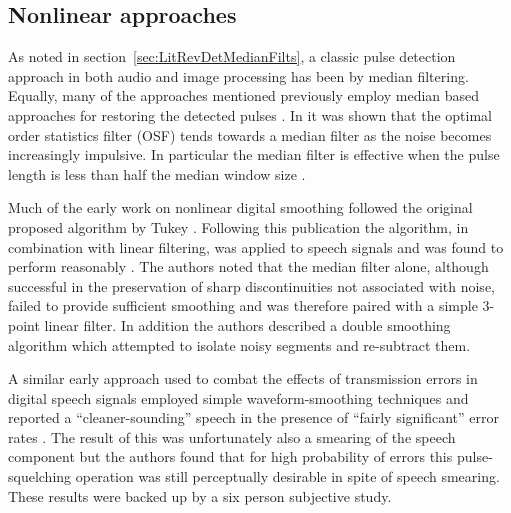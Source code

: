 \subsection{Nonlinear approaches}\label{sec:LitRev_RestorationNonLin}
As noted in section~\ref{sec:LitRevDetMedianFilts}, a classic pulse detection approach in both audio and image processing has been by median filtering. Equally, many of the approaches mentioned previously employ median based approaches for restoring the detected pulses \cite{Tukey1974}\cite{Lee1985}\cite{Heinonen1985}\cite{Heinonen1987}\cite{Maekivirta1991}\cite{Kasparis1993}\cite{Alajlan2004}. In \cite{Bovik1983} it was shown that the optimal order statistics filter (OSF) tends towards a median filter as the noise becomes increasingly impulsive. In particular the median filter is effective when the pulse length is less than half the median window size \cite{Alajlan2004}.

Much of the early work on nonlinear digital smoothing followed the original proposed algorithm by Tukey \cite{Tukey1974}. Following this publication the algorithm, in combination with linear filtering, was applied to speech signals and was found to perform reasonably \cite{Rabiner1975}. The authors noted that the median filter alone, although successful in the preservation of sharp discontinuities not associated with noise, failed to provide sufficient smoothing and was therefore paired with a simple 3-point linear filter. In addition the authors described a double smoothing algorithm which attempted to isolate noisy segments and re-subtract them.


%
%
A similar early approach used to combat the effects of transmission errors in digital speech signals employed simple waveform-smoothing techniques and reported a ``cleaner-sounding'' speech in the presence of ``fairly significant'' error rates \cite{Jayant1976}. The result of this was unfortunately also a smearing of the speech component but the authors found that for high probability of errors this pulse-squelching operation was still perceptually desirable in spite of speech smearing. These results were backed up by a six person subjective study.

%
%

